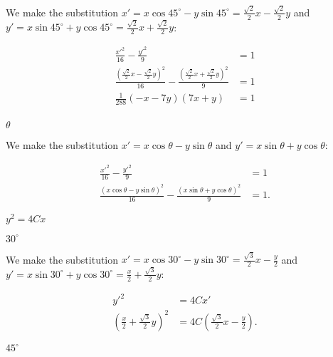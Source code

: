 \documentclass[../gatm_answers.tex]{subfiles}
\begin{document}
We make the substitution $x'=x \cos 45^\circ - y\sin 45^\circ=\frac{\sqrt{2}}{2}x-\frac{\sqrt{2}}{2}y$ and $y'=x\sin 45^\circ + y\cos 45^\circ=\frac{\sqrt{2}}{2}x+\frac{\sqrt{2}}{2}y$:

\begin{align*}
\frac{x'^2}{16}-\frac{y'^2}{9} &= 1 \\
\frac{\left(\frac{\sqrt{2}}{2}x-\frac{\sqrt{2}}{2}y\right)^2}{16} - \frac{\left(\frac{\sqrt{2}}{2}x+\frac{\sqrt{2}}{2}y\right)^2}{9} &= 1 \\
\frac{1}{288} (-x - 7 y) (7 x + y) &= 1 \\
\end{align*}

\begin{iinner_problem}
\item $\theta$
\end{iinner_problem}

We make the substitution $x'=x \cos \theta - y\sin \theta$ and $y'=x\sin \theta + y\cos \theta$:

\begin{align*}
\frac{x'^2}{16}-\frac{y'^2}{9} &= 1 \\
\frac{\left(x \cos \theta - y\sin \theta\right)^2}{16} - \frac{\left(x\sin \theta + y\cos \theta\right)^2}{9} &= 1.
\end{align*}

\begin{inner_problem}
\item $y^2=4Cx$
\end{inner_problem}

\begin{iinner_problem}[start=1]
\item $30^\circ$
\end{iinner_problem}

We make the substitution $x'=x \cos 30^\circ - y\sin 30^\circ=\frac{\sqrt{3}}{2}x-\frac{y}{2}$ and $y'=x\sin 30^\circ + y\cos 30^\circ=\frac{x}{2}+\frac{\sqrt{3}}{2}y$:

\begin{align*}
y'^2&=4Cx' \\
\left(\frac{x}{2}+\frac{\sqrt{3}}{2}y\right)^2 &= 4C\left(\frac{\sqrt{3}}{2}x-\frac{y}{2}\right).
\end{align*}

\begin{iinner_problem}
\item $45^\circ$
\end{iinner_problem}
\end{document}
